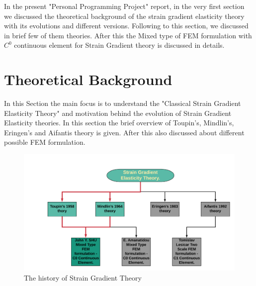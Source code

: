 \documentclass[12pt]{article}
\begin{document}
\newline  
\par
In the present "Personal Programming Project" report, in the very first section we discussed the theoretical background of the strain gradient elasticity theory with its evolutions and different versions. Following to this section, we discussed in brief few of them theories. After this the Mixed type of FEM formulation with $C^{0}$ continuous element for Strain Gradient theory is discussed in details.
\newpage
 
\section{Theoretical Background}
In this Section the main focus is to understand the "Classical Strain Gradient Elasticity Theory" and motivation behind the evolution of Strain Gradient Elasticity theories. In this section the brief overview of Toupin's, Mindlin's, Eringen's and Aifantis theory is given. After this also discussed about different possible FEM formulation.  
     \begin{figure}[H]
     	\begin{center}
     	     	\includegraphics[scale=0.5]{straingradienthistory.png}
     	\end{center}
     	\caption{The history of Strain Gradient Theory}
     \end{figure}
\end{document}
